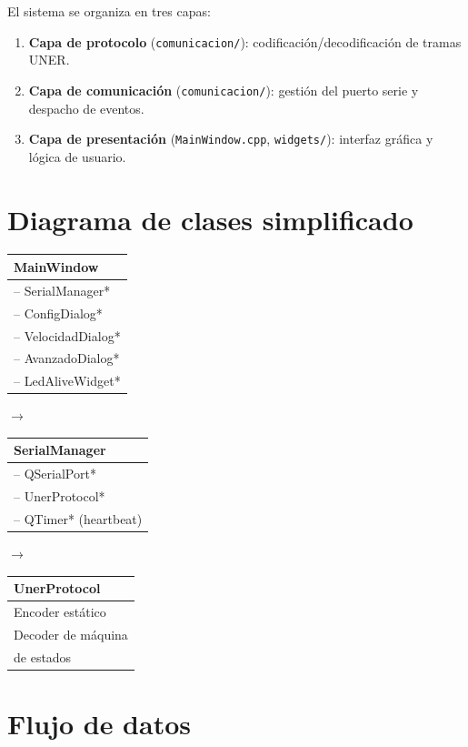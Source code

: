 \documentclass[12pt,a4paper]{report}
\newcommand{\file}[1]{\texttt{#1}}
\begin{document}
El sistema se organiza en tres capas:

\begin{enumerate}
  \item \textbf{Capa de protocolo} (\file{comunicacion/}): codificación/decodificación de tramas UNER.
  \item \textbf{Capa de comunicación} (\file{comunicacion/}): gestión del puerto serie y despacho de eventos.
  \item \textbf{Capa de presentación} (\file{MainWindow.cpp}, \file{widgets/}): interfaz gráfica y lógica de usuario.
\end{enumerate}

\section{Diagrama de clases simplificado}

\begin{center}
\begin{tabular}{|l|}
\hline
\textbf{MainWindow} \\
\hline
-- SerialManager* \\
-- ConfigDialog* \\
-- VelocidadDialog* \\
-- AvanzadoDialog* \\
-- LedAliveWidget* \\
\hline
\end{tabular}
\quad $\rightarrow$ \quad
\begin{tabular}{|l|}
\hline
\textbf{SerialManager} \\
\hline
-- QSerialPort* \\
-- UnerProtocol* \\
-- QTimer* (heartbeat) \\
\hline
\end{tabular}
\quad $\rightarrow$ \quad
\begin{tabular}{|l|}
\hline
\textbf{UnerProtocol} \\
\hline
Encoder estático \\
Decoder de máquina \\
de estados \\
\hline
\end{tabular}
\end{center}

\section{Flujo de datos}
\end{document}
